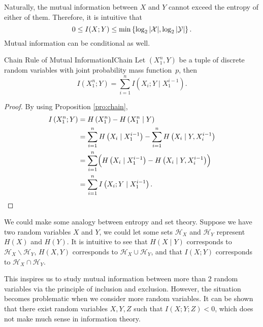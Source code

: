 \documentclass[math]{amznotes}
\theoremstyle{remark}
\begin{document}
Naturally, the mutual information between $X$ and $Y$ cannot exceed the entropy of either of them. Therefore, it is intuitive that 
\begin{equation*}
    0 \leq I(X ; Y) \leq \min\left\{\log_2{\left\lvert {\mathcal{X}} \right\rvert}, \log_2{\left\lvert {\mathcal{Y}} \right\rvert}\right\}.
\end{equation*}
Mutual information can be conditional as well.
\begin{probox}{Chain Rule of Mutual Information}{IChain}
    Let $\left(X_1^n, Y\right)$ be a tuple of discrete random variables with joint probability mass function~$p$, then 
    \begin{equation*}
        I\left(X_1^n ; Y\right) = \sum_{i = 1}^{n}I\left(X_i ; Y \mid X_1^{i - 1}\right).
    \end{equation*}
    \tcblower
    \begin{proof}
        By using Proposition \ref{pro:chain},
        \begin{align*}
            I\left(X_1^n ; Y\right) & = H\left(X_1^n\right) - H\left(X_1^n \mid Y\right) \\
            & = \sum_{i = 1}^{n}H\left(X_i \mid X_1^{i - 1}\right) - \sum_{i = 1}^{n}H\left(X_i \mid Y, X_i^{i - 1}\right) \\
            & = \sum_{i = 1}^{n}\Bigl(H\left(X_i \mid X_1^{i - 1}\right) - H\left(X_i \mid Y, X_i^{i - 1}\right)\Bigr) \\
            & = \sum_{i = 1}^{n}I\left(X_i ; Y \mid X_1^{i - 1}\right).
        \end{align*}
    \end{proof}
\end{probox}
We could make some analogy between entropy and set theory. Suppose we have two random variables $X$ and $Y$, we could let some sets $\mathcal{H}_X$ and $\mathcal{H}_Y$ represent $H\left(X\right)$ and $H\left(Y\right)$. It is intuitive to see that $H\left(X \mid Y\right)$ corresponds to $\mathcal{H}_X \backslash \mathcal{H}_Y$, $H\left(X, Y\right)$ corresponds to $\mathcal{H}_X \cup \mathcal{H}_Y$, and that $I\left(X ; Y\right)$ corresponds to $\mathcal{H}_X \cap \mathcal{H}_Y$.

This inspires us to study mutual information between more than $2$ random variables via the principle of inclusion and exclusion. However, the situation becomes problematic when we consider more random variables. It can be shown that there exist random variables $X, Y, Z$ such that $I\left(X ; Y ; Z\right) < 0$, which does not make much sense in information theory.
\end{document}
